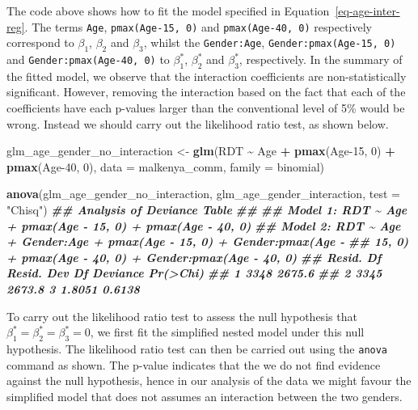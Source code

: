 \documentclass[
  letterpaper,
]{krantz}
\newenvironment{Shaded}{\begin{snugshade}}{\end{snugshade}}
\newcommand{\AttributeTok}[1]{\textcolor[rgb]{0.13,0.29,0.53}{#1}}
\newcommand{\DecValTok}[1]{\textcolor[rgb]{0.00,0.00,0.81}{#1}}
\newcommand{\DocumentationTok}[1]{\textcolor[rgb]{0.56,0.35,0.01}{\textbf{\textit{#1}}}}
\newcommand{\FunctionTok}[1]{\textcolor[rgb]{0.13,0.29,0.53}{\textbf{#1}}}
\newcommand{\NormalTok}[1]{#1}
\newcommand{\OtherTok}[1]{\textcolor[rgb]{0.56,0.35,0.01}{#1}}
\newcommand{\SpecialCharTok}[1]{\textcolor[rgb]{0.81,0.36,0.00}{\textbf{#1}}}
\newcommand{\StringTok}[1]{\textcolor[rgb]{0.31,0.60,0.02}{#1}}
\begin{document}
The code above shows how to fit the model specified in
Equation~\ref{eq-age-inter-reg}. The terms \texttt{Age},
\texttt{pmax(Age-15,\ 0)} and \texttt{pmax(Age-40,\ 0)} respectively
correspond to \(\beta_{1}\), \(\beta_{2}\) and \(\beta_{3}\), whilst the
\texttt{Gender:Age}, \texttt{Gender:pmax(Age-15,\ 0)} and
\texttt{Gender:pmax(Age-40,\ 0)} to \(\beta_{1}^*\), \(\beta_{2}^*\) and
\(\beta_{3}^*\), respectively. In the summary of the fitted model, we
observe that the interaction coefficients are non-statistically
significant. However, removing the interaction based on the fact that
each of the coefficients have each p-values larger than the conventional
level of 5\% would be wrong. Instead we should carry out the likelihood
ratio test, as shown below.

\begin{Shaded}
\begin{Highlighting}[]
\NormalTok{glm\_age\_gender\_no\_interaction }\OtherTok{\textless{}{-}} \FunctionTok{glm}\NormalTok{(RDT }\SpecialCharTok{\textasciitilde{}}\NormalTok{ Age }\SpecialCharTok{+}  \FunctionTok{pmax}\NormalTok{(Age}\DecValTok{{-}15}\NormalTok{, }\DecValTok{0}\NormalTok{) }\SpecialCharTok{+} \FunctionTok{pmax}\NormalTok{(Age}\DecValTok{{-}40}\NormalTok{, }\DecValTok{0}\NormalTok{),}
                              \AttributeTok{data =}\NormalTok{ malkenya\_comm, }\AttributeTok{family =}\NormalTok{ binomial)}

\FunctionTok{anova}\NormalTok{(glm\_age\_gender\_no\_interaction, glm\_age\_gender\_interaction, }\AttributeTok{test =} \StringTok{"Chisq"}\NormalTok{)}
\DocumentationTok{\#\# Analysis of Deviance Table}
\DocumentationTok{\#\# }
\DocumentationTok{\#\# Model 1: RDT \textasciitilde{} Age + pmax(Age {-} 15, 0) + pmax(Age {-} 40, 0)}
\DocumentationTok{\#\# Model 2: RDT \textasciitilde{} Age + Gender:Age + pmax(Age {-} 15, 0) + Gender:pmax(Age {-} }
\DocumentationTok{\#\#     15, 0) + pmax(Age {-} 40, 0) + Gender:pmax(Age {-} 40, 0)}
\DocumentationTok{\#\#   Resid. Df Resid. Dev Df Deviance Pr(\textgreater{}Chi)}
\DocumentationTok{\#\# 1      3348     2675.6                     }
\DocumentationTok{\#\# 2      3345     2673.8  3   1.8051   0.6138}
\end{Highlighting}
\end{Shaded}

To carry out the likelihood ratio test to assess the null hypothesis
that \(\beta_{1}^*=\beta_{2}^*=\beta_{3}^*=0\), we first fit the
simplified nested model under this null hypothesis. The likelihood ratio
test can then be carried out using the \texttt{anova} command as shown.
The p-value indicates that the we do not find evidence against the null
hypothesis, hence in our analysis of the data we might favour the
simplified model that does not assumes an interaction between the two
genders.
\end{document}
